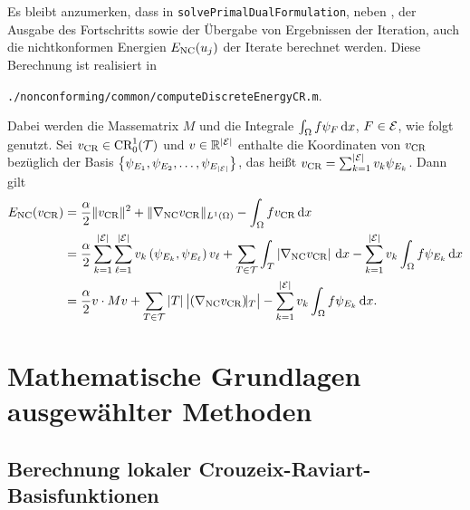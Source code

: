 Es bleibt anzumerken, dass in \texttt{solvePrimalDualFormulation}, neben 
, der Ausgabe des Fortschritts sowie
der Übergabe von Ergebnissen der Iteration, auch die
nichtkonformen Energien $E_\textup{NC}(u_j)$ der Iterate berechnet werden. 
Diese Berechnung ist realisiert in
\begin{center}
  \texttt{./nonconforming/common/computeDiscreteEnergyCR.m}.
\end{center}
Dabei werden die Massematrix $M$ und die Integrale 
$\int_\Omega f\psi_{F}\,\mathrm{d}x$, $F\in\mathcal{E}$, wie folgt genutzt.
Sei $v_\textup{CR}\in\textup{CR}^1_0(\mathcal{T})$ und $v\in\mathbb{R}^{|\mathcal{E}|}$
enthalte die Koordinaten von $v_\textup{CR}$ bezüglich der Basis
$\left\{\psi_{E_1},\psi_{E_2},\ldots,\psi_{E_{|\mathcal{E}|}}\right\}$, das heißt
$v_\textup{CR}=\sum_{k=1}^{|\mathcal{E}|}v_k \psi_{E_k}$.
Dann gilt
\begin{align*}
  E_\textup{NC}(v_\textup{CR})
  &=
  \frac{\alpha}{2}\Vert v_\textup{CR}\Vert^2
  + \Vert\nabla_\textup{NC} v_\textup{CR}\Vert_{L^1(\Omega)}
  -\int_\Omega fv_\textup{CR}\,\mathrm{d}x\\
  &=
  \frac{\alpha}{2}
  \sum_{k=1}^{|\mathcal{E}|} 
  \sum_{\ell=1}^{|\mathcal{E}|} 
  v_k\left( \psi_{E_k}, \psi_{E_\ell} \right)v_\ell
  + \sum_{T\in\mathcal{T}}
   \int_T\left|\nabla_\textup{NC} v_\textup{CR}\right|\,\mathrm{d}x
  -\sum_{k=1}^{|\mathcal{E}|}v_k\int_\Omega f\psi_{E_k}\,\mathrm{d}x\\
  &=
  \frac{\alpha}{2} v\cdot Mv
  + \sum_{T\in\mathcal{T}}|T|\, \big|\!\left(\nabla_\textup{NC} v_\textup{CR}\right)\!\!|_T\big|
  -\sum_{k=1}^{|\mathcal{E}|}v_k\int_\Omega f\psi_{E_k}\,\mathrm{d}x.
\end{align*}


\section{Mathematische Grundlagen ausgewählter Methoden}
\label{sec:mathematicalBasicsForMethods}


\subsection{Berechnung lokaler Crouzeix-Raviart-Basisfunktionen}
\label{sec:localCRBasisRealization}

